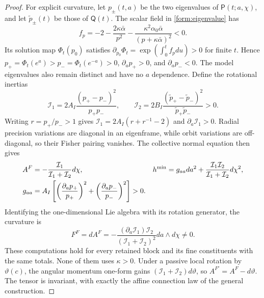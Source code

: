 \begin{proof}
For explicit curvature, let $p_\pm(t,a)$ be the two eigenvalues of
$\mathsf P(t;a,\chi)$, and let $\tilde p_\pm(t)$ be those of $\mathsf Q(t)$.
The scalar field in \cref{form:eigenvalue} has
\begin{equation}
 f_p=-2-\frac{2\kappa\bar\alpha}{p^2}
       -\frac{\kappa^2\alpha_0\bar\alpha}{(p+\kappa\bar\alpha)^2}<0.
\end{equation}
Its solution map $\Phi_t(p_0)$ satisfies
$\partial_{p_0}\Phi_t=\exp(\int_0^t f_pdu)>0$ for finite $t$.
Hence $p_+=\Phi_t(e^a)>p_-=\Phi_t(e^{-a})>0$,
$\partial_a p_+>0$, and $\partial_a p_-<0$.
The model eigenvalues also remain distinct and have no $a$ dependence.
Define the rotational inertias
\begin{equation}
 \mathcal I_1=2A_I\frac{(p_+-p_-)^2}{p_+p_-},\qquad
 \mathcal I_2=2B_I\frac{(\tilde p_+-\tilde p_-)^2}{\tilde p_+\tilde p_-}>0.
 \label{form:inertias}
\end{equation}
Writing $r=p_+/p_->1$ gives $\mathcal I_1=2A_I(r+r^{-1}-2)$ and
$\partial_a\mathcal I_1>0$. Radial precision variations are diagonal in an
eigenframe, while orbit variations are off-diagonal, so their Fisher
pairing vanishes. The collective normal equation then gives
\begin{align}
 A^F&=-\frac{\mathcal I_1}{\mathcal I_1+\mathcal I_2}d\chi,&
 h^{\min}&=g_{aa}da^2+\frac{\mathcal I_1\mathcal I_2}{\mathcal I_1+\mathcal I_2}d\chi^2,
 \label{form:connection}\\
 g_{aa}&=A_I\left[
  \left(\frac{\partial_a p_+}{p_+}\right)^2+
  \left(\frac{\partial_a p_-}{p_-}\right)^2\right]>0.
 \notag
\end{align}
Identifying the one-dimensional Lie algebra with its rotation generator,
the curvature is
\begin{equation}
 F^F=dA^F
 =-\frac{(\partial_a\mathcal I_1)\mathcal I_2}{(\mathcal I_1+\mathcal I_2)^2}da\wedge d\chi\ne0.
 \label{form:curvature}
\end{equation}
These computations hold for every retained block and its fine constituents
with the same totals. None of them uses $\kappa>0$. Under a passive local rotation by $\vartheta(c)$,
the angular momentum one-form gains $(\mathcal I_1+\mathcal I_2)d\vartheta$, so
$A^{F\prime}=A^F-d\vartheta$. The tensor is invariant, with exactly the
affine connection law of the general construction.
\end{proof}

